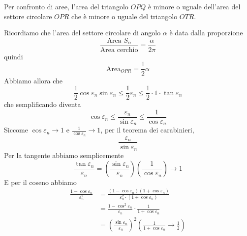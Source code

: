 \documentclass[a4paper]{article}
\begin{document}
\begin{snippetproof}{}
\begin{enumerate}
\begin{center}
        \end{center}

        Per confronto di aree,
        l'area del triangolo \(OPQ\) è minore o uguale dell'area del settore circolare \(OPR\)
        che è minore o uguale del triangolo \(OTR\).
        
        Ricordiamo che l'area del settore circolare di angolo \(\alpha\) è data dalla proporzione
        \[
            \frac{\text{Area } S_\alpha}{\text{Area cerchio}} = \frac{\alpha}{2\pi}
        \]
        quindi
        \[
            \text{Area}_{OPR} = \frac{1}{2} \alpha
        \]
        Abbiamo allora che
        \[
            \frac{1}{2} \cos \varepsilon_n \sin \varepsilon_n
            \leq
            \frac{1}{2} \varepsilon_n
            \leq
            \frac{1}{2} \cdot 1 \cdot \tan \varepsilon_n
        \]
        che semplificando diventa
        \[
            \cos \varepsilon_n \leq \frac{\varepsilon_n}{\sin \varepsilon_n}
            \leq \frac{1}{\cos \varepsilon_n}
        \]
        Siccome \(\cos \varepsilon_n \to 1\) e \(\frac{1}{\cos \varepsilon_n} \to 1\),
        per il teorema dei carabinieri,
        \[
            \frac{\varepsilon_n}{\sin \varepsilon_n}
        \]
        Per la tangente abbiamo semplicemente
        \[
            \frac{\tan \varepsilon_n}{\varepsilon_n} = \left(\frac{\sin \varepsilon_n}{\varepsilon_n}\right)
            \left(\frac{1}{\cos \varepsilon_n}\right) \to 1
        \]
        E per il coseno abbiamo
        \begin{align*}
            \frac{1-\cos \varepsilon_n}{\varepsilon_n^2} &= \frac{
                (1 - \cos \varepsilon_n) ( 1 + \cos \varepsilon_n)
            }{
                \varepsilon_n^2 \cdot (1 + \cos \varepsilon_n)
            } \\
            &= \frac{1 - \cos^2 \varepsilon_n}{\varepsilon_n} \cdot \frac{1}{1 + \cos \varepsilon_n} \\
            &= {\left(\frac{\sin \varepsilon_n}{\varepsilon_n}\right)}^2 \left(\frac{1}{1 + \cos \varepsilon_n} \to \frac{1}{2}\right)
        \end{align*}
    \end{enumerate}
\end{snippetproof}
\end{document}
